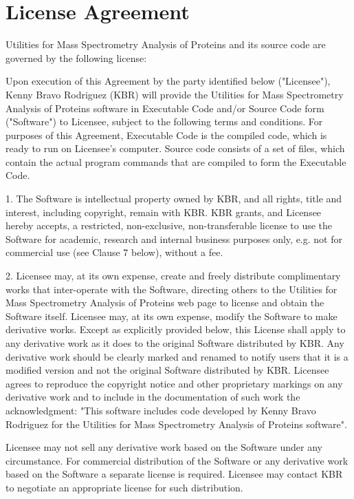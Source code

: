 \chapter{License Agreement}
\label{chap:licagre}

Utilities for Mass Spectrometry Analysis of Proteins and its source code are governed by the following license:

Upon execution of this Agreement by the party identified below ("Licensee"), Kenny Bravo Rodriguez (KBR) will provide the Utilities for Mass Spectrometry Analysis of Proteins software in Executable Code and/or Source Code form ("Software") to Licensee, subject to the following terms and conditions. For purposes of this Agreement, Executable Code is the compiled code, which is ready to run on Licensee's computer. Source code consists of a set of files, which contain the actual program commands that are compiled to form the Executable Code.

1. The Software is intellectual property owned by KBR, and all rights, title and interest, including copyright, remain with KBR. KBR grants, and Licensee hereby accepts, a restricted, non-exclusive, non-transferable license to use the Software for academic, research and internal business purposes only, e.g. not for commercial use (see Clause 7 below), without a fee.

2. Licensee may, at its own expense, create and freely distribute complimentary works that inter-operate with the Software, directing others to the Utilities for Mass Spectrometry Analysis of Proteins web page to license and obtain the Software itself. Licensee may, at its own expense, modify the Software to make derivative works. Except as explicitly provided below, this License shall apply to any derivative work as it does to the original Software distributed by KBR. Any derivative work should be clearly marked and renamed to notify users that it is a modified version and not the original Software distributed by KBR. Licensee agrees to reproduce the copyright notice and other proprietary markings on any derivative work and to include in the documentation of such work the acknowledgment: "This software includes code developed by Kenny Bravo Rodriguez for the Utilities for Mass Spectrometry Analysis of Proteins software".

Licensee may not sell any derivative work based on the Software under any circumstance. For commercial distribution of the Software or any derivative work based on the Software a separate license is required. Licensee may contact KBR to negotiate an appropriate license for such distribution.

